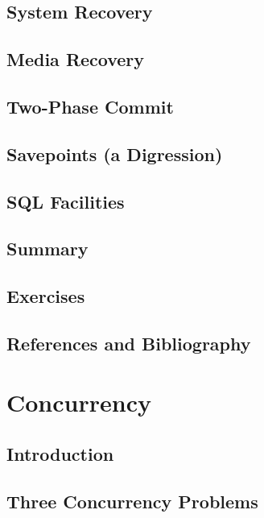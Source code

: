 \documentclass{book}
\begin{document}
\section{System Recovery}

\section{Media Recovery}

\section{Two-Phase Commit}

\section{Savepoints (a Digression)}

\section{SQL Facilities}

\section{Summary}

\section{Exercises}

\section{References and Bibliography}














\chapter{Concurrency}

\section{Introduction}

\section{Three Concurrency Problems}
\end{document}
